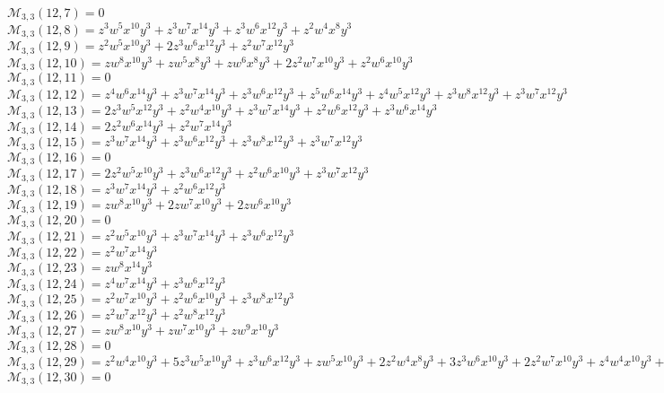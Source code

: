 \documentclass[12pt]{memoireuqam1.3}
\begin{document}
$\mathcal{M}_{3,3}(12,7)=0$\\
$\mathcal{M}_{3,3}(12,8)=z^3w^5x^{10}y^3+z^3w^7x^{14}y^3+z^3w^6x^{12}y^3+z^2w^4x^8y^3$\\
$\mathcal{M}_{3,3}(12,9)=z^2w^5x^{10}y^3+2z^3w^6x^{12}y^3+z^2w^7x^{12}y^3$\\
$\mathcal{M}_{3,3}(12,10)=zw^8x^{10}y^3+zw^5x^8y^3+zw^6x^8y^3+2z^2w^7x^{10}y^3+z^2w^6x^{10}y^3$\\
$\mathcal{M}_{3,3}(12,11)=0$\\
$\mathcal{M}_{3,3}(12,12)=z^4w^6x^{14}y^3+z^3w^7x^{14}y^3+z^3w^6x^{12}y^3+z^5w^6x^{14}y^3+z^4w^5x^{12}y^3+z^3w^8x^{12}y^3+z^3w^7x^{12}y^3$\\
$\mathcal{M}_{3,3}(12,13)=2z^3w^5x^{12}y^3+z^2w^4x^{10}y^3+z^3w^7x^{14}y^3+z^2w^6x^{12}y^3+z^3w^6x^{14}y^3$\\
$\mathcal{M}_{3,3}(12,14)=2z^2w^6x^{14}y^3+z^2w^7x^{14}y^3$\\
$\mathcal{M}_{3,3}(12,15)=z^3w^7x^{14}y^3+z^3w^6x^{12}y^3+z^3w^8x^{12}y^3+z^3w^7x^{12}y^3$\\
$\mathcal{M}_{3,3}(12,16)=0$\\
$\mathcal{M}_{3,3}(12,17)=2z^2w^5x^{10}y^3+z^3w^6x^{12}y^3+z^2w^6x^{10}y^3+z^3w^7x^{12}y^3$\\
$\mathcal{M}_{3,3}(12,18)=z^3w^7x^{14}y^3+z^2w^6x^{12}y^3$\\
$\mathcal{M}_{3,3}(12,19)=zw^8x^{10}y^3+2zw^7x^{10}y^3+2zw^6x^{10}y^3$\\
$\mathcal{M}_{3,3}(12,20)=0$\\
$\mathcal{M}_{3,3}(12,21)=z^2w^5x^{10}y^3+z^3w^7x^{14}y^3+z^3w^6x^{12}y^3$\\
$\mathcal{M}_{3,3}(12,22)=z^2w^7x^{14}y^3$\\
$\mathcal{M}_{3,3}(12,23)=zw^8x^{14}y^3$\\
$\mathcal{M}_{3,3}(12,24)=z^4w^7x^{14}y^3+z^3w^6x^{12}y^3$\\
$\mathcal{M}_{3,3}(12,25)=z^2w^7x^{10}y^3+z^2w^6x^{10}y^3+z^3w^8x^{12}y^3$\\
$\mathcal{M}_{3,3}(12,26)=z^2w^7x^{12}y^3+z^2w^8x^{12}y^3$\\
$\mathcal{M}_{3,3}(12,27)=zw^8x^{10}y^3+zw^7x^{10}y^3+zw^9x^{10}y^3$\\
$\mathcal{M}_{3,3}(12,28)=0$\\
$\mathcal{M}_{3,3}(12,29)=z^2w^4x^{10}y^3+5z^3w^5x^{10}y^3+z^3w^6x^{12}y^3+zw^5x^{10}y^3+2z^2w^4x^8y^3+3z^3w^6x^{10}y^3+2z^2w^7x^{10}y^3+z^4w^4x^{10}y^3+z^2w^5x^8y^3$\\
$\mathcal{M}_{3,3}(12,30)=0$\\
\end{document}
